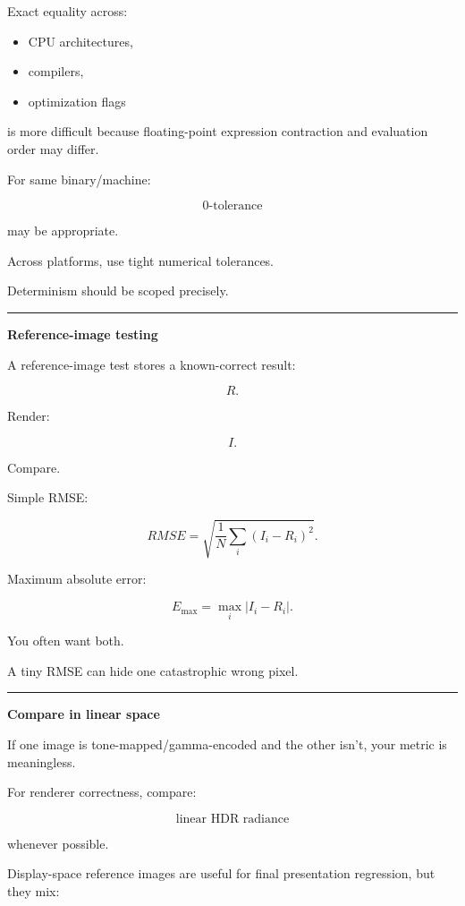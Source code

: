 Exact equality across:

\begin{itemize}
\tightlist
\item
  CPU architectures,
\item
  compilers,
\item
  optimization flags
\end{itemize}

is more difficult because floating-point expression contraction and evaluation order may differ.

For same binary/machine:

\[
0\text{-tolerance}
\]

may be appropriate.

Across platforms, use tight numerical tolerances.

Determinism should be scoped precisely.

\begin{center}\rule{0.5\linewidth}{0.5pt}\end{center}

\textbf{Reference-image testing}

A reference-image test stores a known-correct result:

\[
R.
\]

Render:

\[
I.
\]

Compare.

Simple RMSE:

\[
\boxed{
RMSE
=
\sqrt{
\frac1N
\sum_i
(I_i-R_i)^2
}.
}
\]

Maximum absolute error:

\[
\boxed{
E_{\max}
=
\max_i|I_i-R_i|.
}
\]

You often want both.

A tiny RMSE can hide one catastrophic wrong pixel.

\begin{center}\rule{0.5\linewidth}{0.5pt}\end{center}

\textbf{Compare in linear space}

If one image is tone-mapped/gamma-encoded and the other isn't, your metric is meaningless.

For renderer correctness, compare:

\[
\boxed{\text{linear HDR radiance}}
\]

whenever possible.

Display-space reference images are useful for final presentation regression, but they mix:

